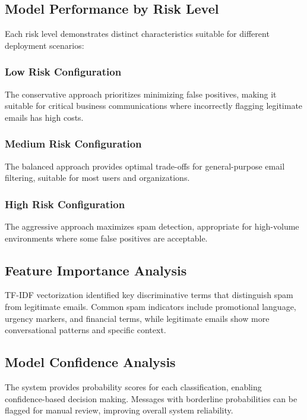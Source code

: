 \documentclass[12pt,a4paper]{article}
\begin{document}

\subsection{Model Performance by Risk Level}

Each risk level demonstrates distinct characteristics suitable for different deployment scenarios:

\subsubsection{Low Risk Configuration}
The conservative approach prioritizes minimizing false positives, making it suitable for critical business communications where incorrectly flagging legitimate emails has high costs.

\subsubsection{Medium Risk Configuration}  
The balanced approach provides optimal trade-offs for general-purpose email filtering, suitable for most users and organizations.

\subsubsection{High Risk Configuration}
The aggressive approach maximizes spam detection, appropriate for high-volume environments where some false positives are acceptable.

\subsection{Feature Importance Analysis}

TF-IDF vectorization identified key discriminative terms that distinguish spam from legitimate emails. Common spam indicators include promotional language, urgency markers, and financial terms, while legitimate emails show more conversational patterns and specific context.

\subsection{Model Confidence Analysis}

The system provides probability scores for each classification, enabling confidence-based decision making. Messages with borderline probabilities can be flagged for manual review, improving overall system reliability.
\end{document}
